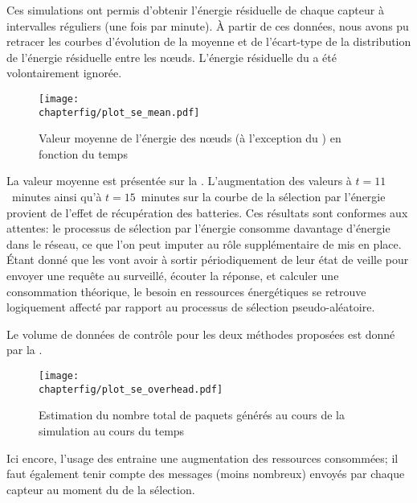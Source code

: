 Ces simulations ont permis d'obtenir l'énergie résiduelle de chaque capteur à intervalles réguliers (une fois par minute).
À partir de ces données, nous avons pu retracer les courbes d'évolution de la moyenne et de l'écart-type de la distribution de l'énergie résiduelle entre les nœuds.
L'énergie résiduelle du \ch a été volontairement ignorée.
\begin{figure}[p]
    \centering
    \texttt{[image: \\chapterfig/plot\_se\_mean.pdf]}
    \caption[Valeur moyenne de l'énergie des nœuds en fonction du temps]{Valeur moyenne de l'énergie des nœuds (à l'exception du \ch) en fonction du temps}\label{se:fig:mean}
\end{figure}
La valeur moyenne est présentée sur la .
L'augmentation des valeurs à $t=11$~minutes ainsi qu'à $t=15$~minutes sur la courbe de la sélection par l'énergie provient de l'effet de récupération des batteries.
Ces résultats sont conformes aux attentes: le processus de sélection par l'énergie consomme davantage d'énergie dans le réseau, ce que l'on peut imputer au rôle supplémentaire de \vn mis en place.
Étant donné que les \vns vont avoir à sortir périodiquement de leur état de veille pour envoyer une requête au \cn surveillé, écouter la réponse, et calculer une consommation théorique, le besoin en ressources énergétiques se retrouve logiquement affecté par rapport au processus de sélection pseudo-aléatoire.

Le volume de données de contrôle pour les deux méthodes proposées est donné par la .
\begin{figure}[p]
    \centering
    \texttt{[image: \\chapterfig/plot\_se\_overhead.pdf]}
    \caption{Estimation du nombre total de paquets générés au cours de la simulation au cours du temps}\label{se:fig:overhead}
\end{figure}
Ici encore, l'usage des \vns entraine une augmentation des ressources consommées; il faut également tenir compte des messages (moins nombreux) envoyés par chaque capteur au moment du  de la sélection.

